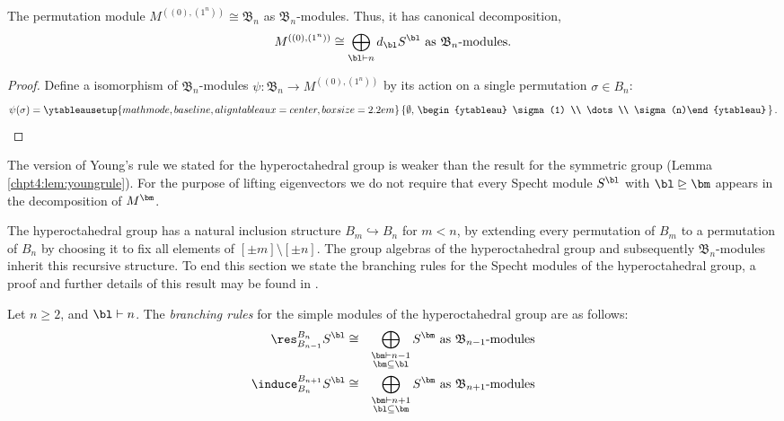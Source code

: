 \documentclass[11pt]{report}
\begin{document}
\begin{lemma}
	\label{chpt6:lem:regdecomp}
	The permutation module $M^{((0),(1^{n}))} \cong \mathfrak{B}_{n}$ as $\mathfrak{B}_{n}$-modules. Thus, it has canonical decomposition,
	\[M^{((0),(1^{n}))} \cong \bigoplus_{\bl \vdash n} d_{\bl} S^{\bl}\textnormal{ as $\mathfrak{B}_{n}$-modules} .\]
\end{lemma}
\begin{proof}
	Define a isomorphism of $\mathfrak{B}_{n}$-modules $\psi:\mathfrak{B}_{n} \to M^{((0),(1^{n}))}$ by its action on a single permutation $\sigma \in B_{n}$:
	\[\psi(\sigma) = 
	\ytableausetup{mathmode,baseline,aligntableaux=center,boxsize=2.2em}
	\left\lbrace \emptyset, \, \begin{ytableau} \sigma(1) \\ \dots  \\ 
	\sigma(n)\end{ytableau} \,
	\right\rbrace. \qedhere\]
\end{proof}



The version of Young's rule we stated for the hyperoctahedral group is weaker than the result for the symmetric group (Lemma \ref{chpt4:lem:youngrule}). For the purpose of lifting eigenvectors we do not require that every Specht module $S^{\bl}$ with  $ \bl \trianglerighteq \bm$ appears in the decomposition of $M^{\bm}$. 

The hyperoctahedral group has a natural inclusion structure $B_{m} \hookrightarrow B_{n}$ for $m<n$, by extending every permutation of $B_{m}$ to a permutation of $B_{n}$ by choosing it to fix all elements of $[\pm m] \setminus [\pm n]$. The group algebras of the hyperoctahedral group and subsequently $\mathfrak{B}_{n}$-modules inherit this recursive structure.	To end this section we state the branching rules for the Specht modules of the hyperoctahedral group, a proof and further details of this result may be found in \cite[Section III]{geissinger1978representations}.


\begin{thm}
	\label{chpt6:thm:branching}
	Let $n \geq 2$, and $\bl \vdash n$. The \emph{branching rules} for the simple modules of the hyperoctahedral group are as follows:
	\begin{eqnarray}
	\res_{B_{n-1}}^{B_{n}} S^{\bl} & \cong & \bigoplus_{\substack{\bm \vdash n-1 \\ \bm \subseteq \bl}} S^{\bm} \textnormal{ as $\mathfrak{B}_{n-1}$-modules}\label{chpt6:eqn:restrict}\\
	\induce_{B_{n}}^{B_{n+1}} S^{\bl} & \cong &\bigoplus_{\substack{\bm \vdash n+1 \\ \bl \subseteq \bm }} S^{\bm} \textnormal{ as $\mathfrak{B}_{n+1}$-modules} \label{chpt:eqn:induce}
	\end{eqnarray}
\end{thm}
\end{document}
